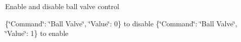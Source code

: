 
\begin{DoxyItemize}
\item Enable and disable ball valve control
\end{DoxyItemize}

{\ttfamily \{\char`\"{}\+Command\char`\"{}\+: \char`\"{}\+Ball Valve\char`\"{}, \char`\"{}\+Value\char`\"{}\+: 0\}} to disable {\ttfamily \{\char`\"{}\+Command\char`\"{}\+: \char`\"{}\+Ball Valve\char`\"{}, \char`\"{}\+Value\char`\"{}\+: 1\}} to enable 